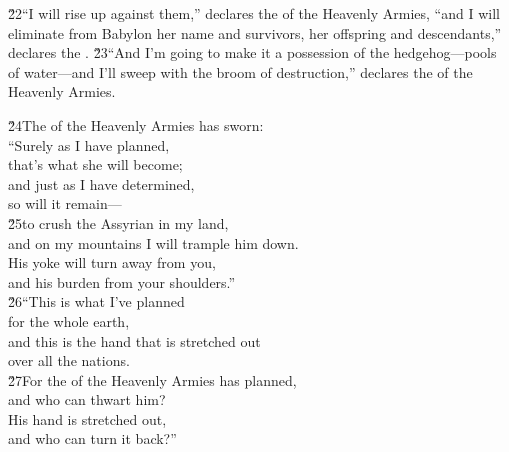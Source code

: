 \v{22}``I will rise up against them,'' declares the  of the Heavenly Armies, ``and I will eliminate from Babylon her name and survivors, her offspring and descendants,'' declares the . \v{23}``And I'm going to make it a possession of the hedgehog---pools of water---and I'll sweep with the broom of destruction,'' declares the  of the Heavenly Armies.

\begin{poetry}
\poeml \v{24}The  of the Heavenly Armies has sworn: \\
\poeml ``Surely as I have planned, \\
\poemll    that's what she will become; \\
\poeml and just as I have determined, \\
\poemll    so will it remain--- \\
\poeml \v{25}to crush the Assyrian in my land, \\
\poemll    and on my mountains I will trample him down. \\
\poeml His yoke will turn away from you, \\
\poemll    and his burden from your shoulders.'' \\
\poeml \v{26}``This is what I've planned \\
\poemll    for the whole earth, \\
\poeml and this is the hand that is stretched out \\
\poemll    over all the nations. \\
\poeml \v{27}For the  of the Heavenly Armies has planned, \\
\poemll    and who can thwart him? \\
\poeml His hand is stretched out, \\
\poemll    and who can turn it back?''
\end{poetry}

